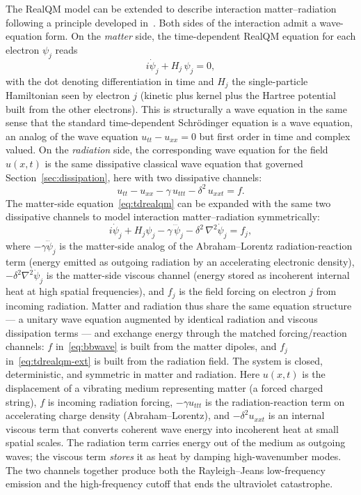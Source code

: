 \documentclass[11pt]{article}
\begin{document}
The RealQM model can be extended to describe interaction matter--radiation following a principle developed in~\cite{Johnson2010BB}. Both sides of the interaction admit a wave-equation form. On the \emph{matter} side, the time-dependent RealQM equation for each electron $\psi_j$ reads
\begin{equation}
i \dot \psi_j + H_j\, \psi_j = 0,
\label{eq:tdrealqm}
\end{equation}
with the dot denoting differentiation in time and $H_j$ the single-particle Hamiltonian seen by electron $j$ (kinetic plus kernel plus the Hartree potential built from the other electrons). This is structurally a wave equation in the same sense that the standard time-dependent Schr\"odinger equation is a wave equation, an analog of the wave equation $u_{tt} - u_{xx} = 0$ but first order in time and complex valued.
On the \emph{radiation} side, the corresponding wave equation for the field $u(x,t)$ is the same dissipative classical wave equation that governed Section~\ref{sec:dissipation}, here with two dissipative channels:
\begin{equation}
u_{tt} - u_{xx} - \gamma\, u_{ttt} - \delta^2\, u_{xxt} = f.
\label{eq:bbwave}
\end{equation}
The matter-side equation~\eqref{eq:tdrealqm} can be expanded with the same two dissipative channels to model interaction matter--radiation symmetrically:
\begin{equation}
i \dot \psi_j + H_j \psi_j - \gamma\, \dddot \psi_j - \delta^2\, \nabla^2 \dot \psi_j = f_j,
\label{eq:tdrealqm-ext}
\end{equation}
where $-\gamma \dddot \psi_j$ is the matter-side analog of the Abraham--Lorentz radiation-reaction term (energy emitted as outgoing radiation by an accelerating electronic density), $-\delta^2 \nabla^2 \dot \psi_j$ is the matter-side viscous channel (energy stored as incoherent internal heat at high spatial frequencies), and $f_j$ is the field forcing on electron $j$ from incoming radiation. Matter and radiation thus share the same equation structure --- a unitary wave equation augmented by identical radiation and viscous dissipation terms --- and exchange energy through the matched forcing/reaction channels: $f$ in~\eqref{eq:bbwave} is built from the matter dipoles, and $f_j$ in~\eqref{eq:tdrealqm-ext} is built from the radiation field. The system is closed, deterministic, and symmetric in matter and radiation.
Here $u(x,t)$ is the displacement of a vibrating medium representing matter (a forced charged string), $f$ is incoming radiation forcing, $-\gamma u_{ttt}$ is the radiation-reaction term on accelerating charge density (Abraham--Lorentz), and $-\delta^2 u_{xxt}$ is an internal viscous term that converts coherent wave energy into incoherent heat at small spatial scales. The radiation term carries energy out of the medium as outgoing waves; the viscous term \emph{stores} it as heat by damping high-wavenumber modes. The two channels together produce both the Rayleigh--Jeans low-frequency emission and the high-frequency cutoff that ends the ultraviolet catastrophe.
\end{document}
